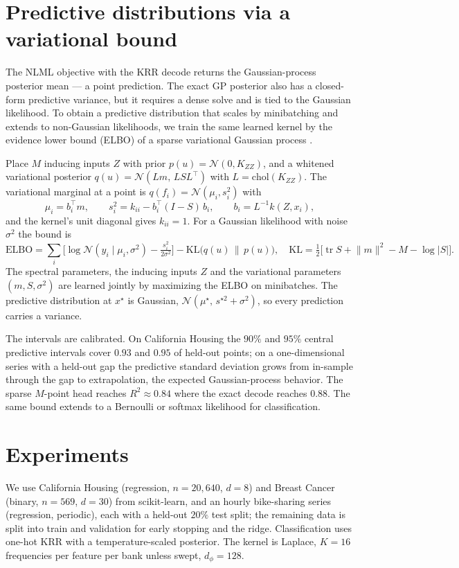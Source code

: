 \documentclass[11pt]{article}
\theoremstyle{definition}
\newcommand{\norm}[1]{\lVert #1 \rVert}
\DeclareMathOperator{\tr}{tr}
\begin{document}
\section{Predictive distributions via a variational bound}\label{sec:elbo}
The NLML objective with the KRR decode returns the Gaussian-process posterior mean --- a point
prediction. The exact GP posterior also has a closed-form predictive variance, but it requires a
dense solve and is tied to the Gaussian likelihood. To obtain a predictive distribution that
scales by minibatching and extends to non-Gaussian likelihoods, we train the same learned kernel
by the evidence lower bound (ELBO) of a sparse variational Gaussian process
\citep{titsias2009,hensman2013}.

Place $M$ inducing inputs $Z$ with prior $p(u)=\mathcal N(0,K_{ZZ})$, and a whitened variational
posterior $q(u)=\mathcal N(L m,\,L S L^\top)$ with $L=\mathrm{chol}(K_{ZZ})$. The variational
marginal at a point is $q(f_i)=\mathcal N(\mu_i,s_i^2)$ with
\begin{equation}
\mu_i=b_i^\top m,\qquad s_i^2=k_{ii}-b_i^\top(I-S)\,b_i,\qquad b_i=L^{-1}k(Z,x_i),
\end{equation}
and the kernel's unit diagonal gives $k_{ii}=1$. For a Gaussian likelihood with noise $\sigma^2$
the bound is
\begin{equation}
\mathrm{ELBO}=\sum_{i}\Big[\log\mathcal N(y_i\mid\mu_i,\sigma^2)-\tfrac{s_i^2}{2\sigma^2}\Big]
-\mathrm{KL}\big(q(u)\,\|\,p(u)\big),\quad
\mathrm{KL}=\tfrac12\big[\tr S+\norm{m}^2-M-\log\lvert S\rvert\big].
\end{equation}
The spectral parameters, the inducing inputs $Z$ and the variational parameters $(m,S,\sigma^2)$
are learned jointly by maximizing the ELBO on minibatches. The predictive distribution at $x^\star$
is Gaussian, $\mathcal N(\mu^\star,\,s^{\star2}+\sigma^2)$, so every prediction carries a variance.

The intervals are calibrated. On California Housing the $90\%$ and $95\%$ central predictive
intervals cover $0.93$ and $0.95$ of held-out points; on a one-dimensional series with a held-out
gap the predictive standard deviation grows from in-sample through the gap to extrapolation, the
expected Gaussian-process behavior. The sparse $M$-point head reaches $R^2\approx0.84$ where the
exact decode reaches $0.88$. The same bound extends to a Bernoulli or softmax likelihood for
classification.

\section{Experiments}\label{sec:exp}
We use California Housing (regression, $n{=}20{,}640$, $d{=}8$) and Breast Cancer (binary,
$n{=}569$, $d{=}30$) from scikit-learn, and an hourly bike-sharing series (regression, periodic),
each with a held-out $20\%$ test split; the remaining data is split into train and validation for
early stopping and the ridge. Classification uses one-hot KRR with a temperature-scaled
posterior. The kernel is Laplace, $K=16$ frequencies per feature per bank unless swept,
$d_\phi=128$.
\end{document}
